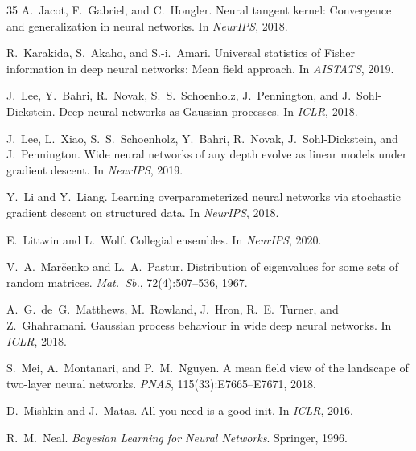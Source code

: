 \documentclass[10pt]{article}
\theoremstyle{definition}
\begin{document}
\begin{thebibliography}{35}
A.~Jacot, F.~Gabriel, and C.~Hongler.
\newblock Neural tangent kernel: Convergence and generalization in neural networks.
\newblock In \emph{NeurIPS}, 2018.

R.~Karakida, S.~Akaho, and S.-i.~Amari.
\newblock Universal statistics of Fisher information in deep neural networks: Mean field approach.
\newblock In \emph{AISTATS}, 2019.

J.~Lee, Y.~Bahri, R.~Novak, S.~S.~Schoenholz, J.~Pennington, and J.~Sohl-Dickstein.
\newblock Deep neural networks as Gaussian processes.
\newblock In \emph{ICLR}, 2018.

J.~Lee, L.~Xiao, S.~S.~Schoenholz, Y.~Bahri, R.~Novak, J.~Sohl-Dickstein, and J.~Pennington.
\newblock Wide neural networks of any depth evolve as linear models under gradient descent.
\newblock In \emph{NeurIPS}, 2019.

Y.~Li and Y.~Liang.
\newblock Learning overparameterized neural networks via stochastic gradient descent on structured data.
\newblock In \emph{NeurIPS}, 2018.

E.~Littwin and L.~Wolf.
\newblock Collegial ensembles.
\newblock In \emph{NeurIPS}, 2020.

V.~A.~Mar{\v{c}}enko and L.~A.~Pastur.
\newblock Distribution of eigenvalues for some sets of random matrices.
\newblock \emph{Mat.\ Sb.}, 72(4):507--536, 1967.

A.~G.~de~G.~Matthews, M.~Rowland, J.~Hron, R.~E.~Turner, and Z.~Ghahramani.
\newblock Gaussian process behaviour in wide deep neural networks.
\newblock In \emph{ICLR}, 2018.

S.~Mei, A.~Montanari, and P.~M.~Nguyen.
\newblock A mean field view of the landscape of two-layer neural networks.
\newblock \emph{PNAS}, 115(33):E7665--E7671, 2018.

D.~Mishkin and J.~Matas.
\newblock All you need is a good init.
\newblock In \emph{ICLR}, 2016.

R.~M.~Neal.
\newblock \emph{Bayesian Learning for Neural Networks}.
\newblock Springer, 1996.


\end{thebibliography}
\end{document}
